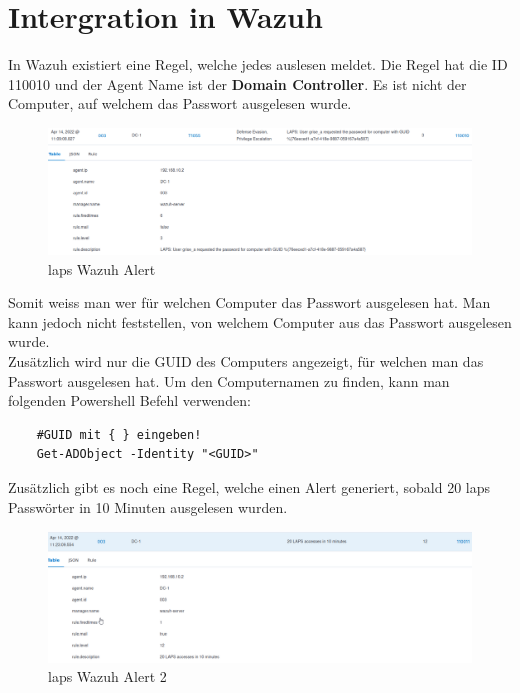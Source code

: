 \section{Intergration in Wazuh}
In Wazuh existiert eine Regel, welche jedes auslesen meldet.
Die Regel hat die ID 110010 und der Agent Name ist der \textbf{Domain Controller}.
Es ist nicht der Computer, auf welchem das Passwort ausgelesen wurde.
\begin{figure}[H]
    \centering
    \includegraphics[width=\linewidth]{../img/LAPS/laps-wazuh.png}
    \caption{\acrshort{laps} Wazuh Alert}
\end{figure}
Somit weiss man wer für welchen Computer das Passwort ausgelesen hat.
Man kann jedoch nicht feststellen, von welchem Computer aus das Passwort ausgelesen wurde.\\

Zusätzlich wird nur die GUID des Computers angezeigt, für welchen man das Passwort ausgelesen hat.
Um den Computernamen zu finden, kann man folgenden Powershell Befehl verwenden:
\begin{lstlisting}
    #GUID mit { } eingeben!
    Get-ADObject -Identity "<GUID>"
\end{lstlisting}

Zusätzlich gibt es noch eine Regel, welche einen Alert generiert, sobald 20 \acrshort{laps} Passwörter in 10 Minuten ausgelesen wurden.
\begin{figure}[H]
    \centering
    \includegraphics[width=\linewidth]{../img/LAPS/laps-wazuh-alert.png}
    \caption{\acrshort{laps} Wazuh Alert 2}
\end{figure}
